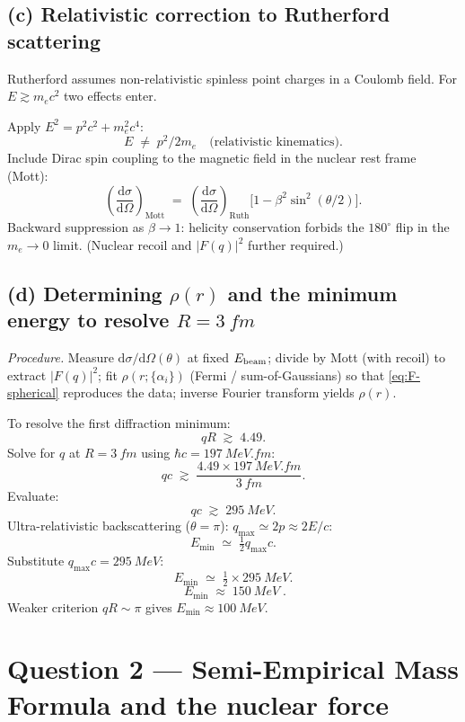 \documentclass[11pt]{article}
\newcommand{\de}{\mathrm{d}}
\begin{document}
\subsection*{(c) Relativistic correction to Rutherford scattering}

Rutherford assumes non-relativistic spinless point charges in a Coulomb field. For $E\gtrsim m_{e}c^{2}$ two effects enter.

Apply $E^{2}=p^{2}c^{2}+m_{e}^{2}c^{4}$:
\[
E\;\neq\;p^{2}/2m_{e}\quad\text{(relativistic kinematics)}.
\]
Include Dirac spin coupling to the magnetic field in the nuclear rest frame (Mott):
\begin{equation}
\left(\frac{\de\sigma}{\de\Omega}\right)_\text{Mott}\;=\;\left(\frac{\de\sigma}{\de\Omega}\right)_\text{Ruth}\bigl[1-\beta^{2}\sin^{2}(\theta/2)\bigr].
\label{eq:Mott}
\end{equation}
Backward suppression as $\beta\to 1$: helicity conservation forbids the $180^{\circ}$ flip in the $m_{e}\to 0$ limit. (Nuclear recoil and $|F(q)|^{2}$ further required.)

\subsection*{(d) Determining $\rho(r)$ and the minimum energy to resolve $R=\SI{3}{fm}$}

\emph{Procedure.} Measure $\de\sigma/\de\Omega(\theta)$ at fixed $E_{\rm beam}$; divide by Mott (with recoil) to extract $|F(q)|^{2}$; fit $\rho(r;\{\alpha_{i}\})$ (Fermi / sum-of-Gaussians) so that \eqref{eq:F-spherical} reproduces the data; inverse Fourier transform yields $\rho(r)$.

To resolve the first diffraction minimum:
\[
qR\;\gtrsim\;4.49.
\]
Solve for $q$ at $R=\SI{3}{fm}$ using $\hbar c=\SI{197}{MeV.fm}$:
\[
qc\;\gtrsim\;\frac{4.49\times \SI{197}{MeV.fm}}{\SI{3}{fm}}.
\]
Evaluate:
\[
qc\;\gtrsim\;\SI{295}{MeV}.
\]
Ultra-relativistic backscattering ($\theta=\pi$): $q_{\max}\simeq 2p\approx 2E/c$:
\[
E_{\min}\;\simeq\;\tfrac{1}{2}q_{\max}c.
\]
Substitute $q_{\max}c=\SI{295}{MeV}$:
\[
E_{\min}\;\simeq\;\tfrac{1}{2}\times\SI{295}{MeV}.
\]
\begin{equation}
\boxed{\;E_{\min}\;\approx\;\SI{150}{MeV}\;.}
\label{eq:Emin}
\end{equation}
Weaker criterion $qR\sim\pi$ gives $E_{\min}\approx\SI{100}{MeV}$.

\section*{Question 2 --- Semi-Empirical Mass Formula and the nuclear force}
\end{document}
